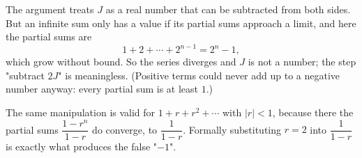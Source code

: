 The argument treats $J$ as a real number that can be subtracted from both sides. But an infinite sum only has a value if its partial sums approach a limit, and here the partial sums are
\[1+2+\cdots+2^{n-1}=2^n-1,\]
which grow without bound. So the series diverges and $J$ is not a number; the step "subtract $2J$" is meaningless. (Positive terms could never add up to a negative number anyway: every partial sum is at least $1$.)

The same manipulation is valid for $1+r+r^2+\cdots$ with $|r|<1$, because there the partial sums $\dfrac{1-r^n}{1-r}$ do converge, to $\dfrac1{1-r}$. Formally substituting $r=2$ into $\dfrac{1}{1-r}$ is exactly what produces the false "$-1$".
